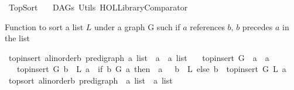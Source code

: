 %
\begin{isabellebody}%
%
%
\isadelimtheory
%
\endisadelimtheory
%
\isatagtheory
{}\isamarkupfalse%
\ TopSort\isanewline
\ \ \ DAGs\ Utils\ {\isachardoublequoteopen}HOL{\isacharminus}{\kern0pt}Library{\isachardot}{\kern0pt}Comparator{\isachardoublequoteclose}\isanewline
{}%
\endisatagtheory
{\isafoldtheory}%
%
\isadelimtheory
%
\endisadelimtheory
%
\begin{isamarkuptext}%
Function to sort a list $L$ under a graph G such if $a$ references $b$,
$b$ precedes $a$ in the list%
\end{isamarkuptext}\isamarkuptrue%
\isamarkupfalse%
\ top{\isacharunderscore}{\kern0pt}insert{\isacharcolon}{\kern0pt}{\isacharcolon}{\kern0pt}\ {\isachardoublequoteopen}{\isacharparenleft}{\kern0pt}{\isacharprime}{\kern0pt}a{\isacharcolon}{\kern0pt}{\isacharcolon}{\kern0pt}linorder{\isacharcomma}{\kern0pt}{\isacharprime}{\kern0pt}b{\isacharparenright}{\kern0pt}\ pre{\isacharunderscore}{\kern0pt}digraph\ {\isasymRightarrow}{\isacharprime}{\kern0pt}a\ list\ {\isasymRightarrow}\ {\isacharprime}{\kern0pt}a\ {\isasymRightarrow}\ {\isacharprime}{\kern0pt}a\ list{\isachardoublequoteclose}\isanewline
\ \ \ {\isachardoublequoteopen}top{\isacharunderscore}{\kern0pt}insert\ G\ {\isacharbrackleft}{\kern0pt}{\isacharbrackright}{\kern0pt}\ a\ {\isacharequal}{\kern0pt}\ {\isacharbrackleft}{\kern0pt}a{\isacharbrackright}{\kern0pt}{\isachardoublequoteclose}\isanewline
\ \ {\isacharbar}{\kern0pt}\ {\isachardoublequoteopen}top{\isacharunderscore}{\kern0pt}insert\ G\ {\isacharparenleft}{\kern0pt}b\ {\isacharhash}{\kern0pt}\ L{\isacharparenright}{\kern0pt}\ a\ {\isacharequal}{\kern0pt}\ {\isacharparenleft}{\kern0pt}if\ {\isacharparenleft}{\kern0pt}b\ {\isasymrightarrow}\isactrlsup {\isacharplus}{\kern0pt}\isactrlbsub G\isactrlesub \ a{\isacharparenright}{\kern0pt}\ then\ \ {\isacharparenleft}{\kern0pt}a\ {\isacharhash}{\kern0pt}\ {\isacharparenleft}{\kern0pt}\ b\ {\isacharhash}{\kern0pt}\ L{\isacharparenright}{\kern0pt}{\isacharparenright}{\kern0pt}\ else\ {\isacharparenleft}{\kern0pt}b\ {\isacharhash}{\kern0pt}\ top{\isacharunderscore}{\kern0pt}insert\ G\ L\ a{\isacharparenright}{\kern0pt}{\isacharparenright}{\kern0pt}{\isachardoublequoteclose}\isanewline
\isanewline
{}\isamarkupfalse%
\ top{\isacharunderscore}{\kern0pt}sort{\isacharcolon}{\kern0pt}{\isacharcolon}{\kern0pt}\ {\isachardoublequoteopen}{\isacharparenleft}{\kern0pt}{\isacharprime}{\kern0pt}a{\isacharcolon}{\kern0pt}{\isacharcolon}{\kern0pt}linorder{\isacharcomma}{\kern0pt}{\isacharprime}{\kern0pt}b{\isacharparenright}{\kern0pt}\ pre{\isacharunderscore}{\kern0pt}digraph\ {\isasymRightarrow}\ {\isacharprime}{\kern0pt}a\ list\ {\isasymRightarrow}\ {\isacharprime}{\kern0pt}a\ list{\isachardoublequoteclose}\isanewline

\end{isabellebody}
